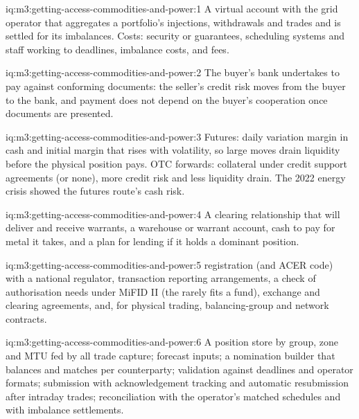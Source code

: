 \begin{solution}{iq:m3:getting-access-commodities-and-power:1}
A virtual account with the grid operator that aggregates a portfolio's injections, withdrawals and trades and is
settled for its imbalances. Costs: security or guarantees, scheduling systems and staff working to deadlines,
imbalance costs, and fees.
\end{solution}

\begin{solution}{iq:m3:getting-access-commodities-and-power:2}
The buyer's bank undertakes to pay against conforming documents: the seller's credit risk moves from the buyer to
the bank, and payment does not depend on the buyer's cooperation once documents are presented.
\end{solution}

\begin{solution}{iq:m3:getting-access-commodities-and-power:3}
Futures: daily variation margin in cash and initial margin that rises with volatility, so large moves drain
liquidity before the physical position pays. OTC forwards: collateral under credit support agreements (or none),
more credit risk and less liquidity drain. The 2022 energy crisis showed the futures route's cash risk.
\end{solution}

\begin{solution}{iq:m3:getting-access-commodities-and-power:4}
A clearing relationship that will deliver and receive warrants, a warehouse or warrant account, cash to pay for
metal it takes, and a plan for lending if it holds a dominant position.
\end{solution}

\begin{solution}{iq:m3:getting-access-commodities-and-power:5}
 registration (and ACER code) with a national regulator, transaction reporting arrangements, a check of
authorisation needs under MiFID II (the  rarely fits a fund), exchange and clearing
agreements, and, for physical trading, balancing-group and network contracts.
\end{solution}

\begin{solution}{iq:m3:getting-access-commodities-and-power:6}
A position store by group, zone and MTU fed by all trade capture; forecast inputs; a nomination builder that
balances and matches per counterparty; validation against deadlines and operator formats; submission with
acknowledgement tracking and automatic resubmission after intraday trades; reconciliation with the operator's
matched schedules and with imbalance settlements.
\end{solution}

